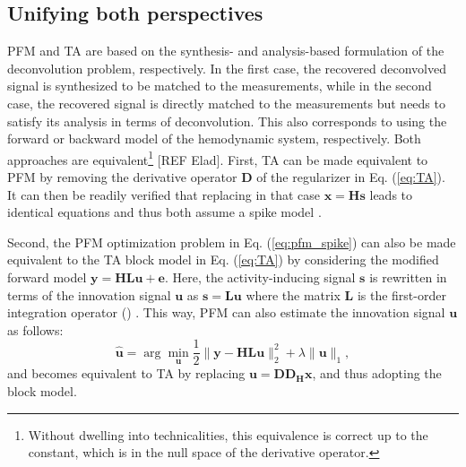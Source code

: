 \subsection{Unifying both perspectives}

PFM and TA are based on the synthesis- and analysis-based formulation of the deconvolution problem, respectively. In the first case, the recovered deconvolved signal is synthesized to be matched to the measurements, while in the second case, the recovered signal is directly matched to the measurements but needs to satisfy its analysis in terms of deconvolution. This also corresponds to using the forward or backward model of the hemodynamic system, respectively. Both approaches are equivalent\footnote{Without dwelling into technicalities, this equivalence is correct up to the constant, which is in the null space of the derivative operator.} [REF Elad]. First, TA can be made equivalent to PFM by removing the derivative operator $\mathbf{D}$ of the regularizer in Eq. (\ref{eq:TA}). It can then be readily verified that replacing in that case $\mathbf{x}=\mathbf{Hs}$ leads to identical equations and thus both assume a spike model . 

Second, the PFM optimization problem in Eq. (\ref{eq:pfm_spike}) can also be made equivalent to the TA block model in Eq. (\ref{eq:TA}) by considering the modified forward model $\mathbf{y} = \mathbf{H L u} + \mathbf{e}$. Here, the activity-inducing signal $\mathbf{s}$ is rewritten in terms of the innovation signal $\mathbf{u}$ as $\mathbf{s}=\mathbf{Lu}$ where the matrix $\mathbf{L}$ is the first-order integration operator (\citealt{Cherkaoui2019SparsitybasedBlind,Urunuela2020StabilityBasedSparse}) . This way, PFM can also estimate the innovation signal $\mathbf{u}$ as follows: 
\begin{equation}
    \label{eq:pfm_block}
    \hat{\mathbf{u}} = \arg \min_{\mathbf{u}} \frac{1}{2} \| \mathbf{y} - \mathbf{HLu} \|_2^2 + \lambda \| \mathbf{u} \|_1,
\end{equation}
and becomes equivalent to TA by replacing $\mathbf{u}=\mathbf{D D_H x}$, and thus adopting the block model.

